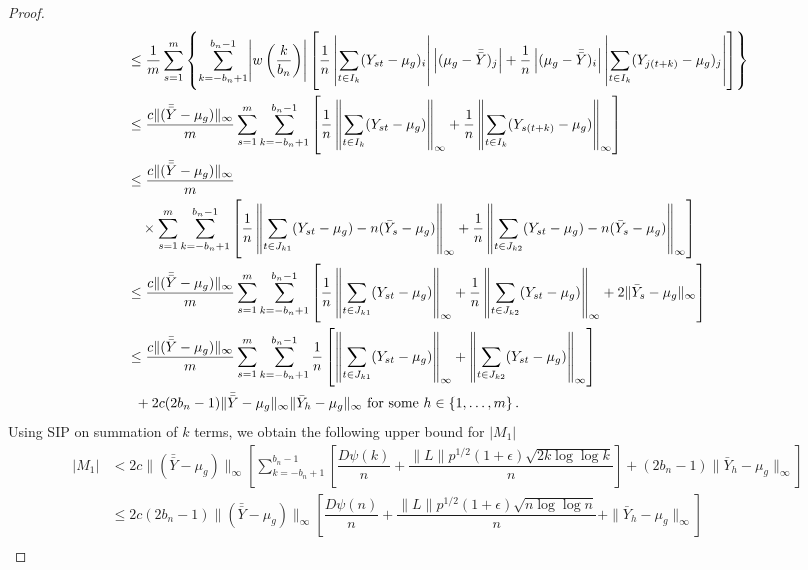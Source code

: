 \documentclass[12pt]{article}
\theoremstyle{remark}
\begin{document}
\begin{proof}
\begin{align*}
    & \leq \dfrac{1}{m}\sum_{s=1}^{m}\left\{\sum_{k=-b_n+1}^{b_n-1}\abs{w\left(\dfrac{k}{b_n}\right)}\left[ \dfrac{1}{n}\left|\sum_{t \in I_k}(Y_{st}- \mu_g)_i\right|\left|(\mu_g-\bar{\bar{Y}})_j\right|+ \dfrac{1}{n}\left|(\mu_g-\bar{\bar{Y}})_i\right|\left|\sum_{t \in I_k }(Y_{j(t+k)}-\mu_g)_j\right|\right]\right\}\\
    & \leq \dfrac{c\|(\bar{\bar{Y}} - \mu_g)\|_{\infty}}{m} \sum_{s=1}^{m}\sum\limits_{k=-b_n+1}^{b_n-1}\left[ \dfrac{1}{n}\left\|\sum_{t \in I_k}(Y_{st}-\mu_g)\right\|_{\infty} + \dfrac{1}{n}\left\|\sum_{t \in I_k}(Y_{s(t+k)}-\mu_g)\right\|_{\infty} \right]\\
    &\leq \dfrac{c\|(\bar{\bar{Y}} - \mu_g)\|_{\infty}}{m} \\
    & \quad \times \sum_{s=1}^{m}\sum_{k=-b_n+1}^{b_n-1}\left[ \dfrac{1}{n}\left\|\sum_{t \in J_{k1}}(Y_{st} - \mu_g) - n(\bar{Y}_s - \mu_g) \right\|_{\infty} + \dfrac{1}{n}\left\|\sum_{t \in J_{k2}}(Y_{st} - \mu_g) - n(\bar{Y}_s - \mu_g)\right\|_{\infty} \right]\\
    &\leq \dfrac{c\|(\bar{\bar{Y}} - \mu_g)\|_{\infty}}{m} \sum_{s=1}^{m}\sum\limits_{k=-b_n+1}^{b_n-1}\left[ \dfrac{1}{n}\left\|\sum_{t \in J_{k1}}(Y_{st} - \mu_g)\right\|_{\infty} + \dfrac{1}{n}\left\|\sum_{t \in J_{k2}}(Y_{st} - \mu_g)\right\|_{\infty} + 2\|\bar{Y}_s - \mu_g\|_{\infty} \right]\\
    & \leq \dfrac{c\|(\bar{\bar{Y}} - \mu_g)\|_{\infty}}{m} \sum\limits_{s=1}^{m}\sum_{k=-b_n + 1}^{b_n-1}   \dfrac{1}{n}\left[\left\|\sum_{t \in J_{k1}}(Y_{st} - \mu_g)\right\|_{\infty} + \left\|\sum_{t \in J_{k2}}(Y_{st} - \mu_g)\right\|_{\infty} \right]\\
    & \; \;+ 2c(2b_n - 1)\|\bar{\bar{Y}} - \mu_g\|_{\infty}\|\bar{Y}_h - \mu_g\|_{\infty} \textrm{ for some } h \in \{1, \dots, m\} \,.
\end{align*}
%
Using SIP on summation of $k$ terms, we obtain the following upper bound for $|M_1|$
\begin{align*}
|M_1|
    & < 2c\|(\bar{\bar{Y}} - \mu_g)\|_{\infty} \left[\sum\limits_{k=-b_n + 1}^{b_n-1}\left[ \dfrac{D \psi(k)}{n} + \dfrac{\|L\| p^{1/2}(1+\epsilon)\sqrt{2k \log\log k}}{n}  \right]  + (2b_n - 1) \|\bar{Y}_h - \mu_g\|_{\infty}  \right]\\
    &\leq 2c(2b_n - 1)\|(\bar{\bar{Y}} - \mu_g)\|_{\infty} \left[ \dfrac{D \psi(n)}{n} + \dfrac{\|L\| p^{1/2}(1+\epsilon)\sqrt{n \log\log n}}{n} + \|\bar{Y}_h - \mu_g\|_{\infty}  \right]\\

\end{align*}
\end{proof}
\end{document}
